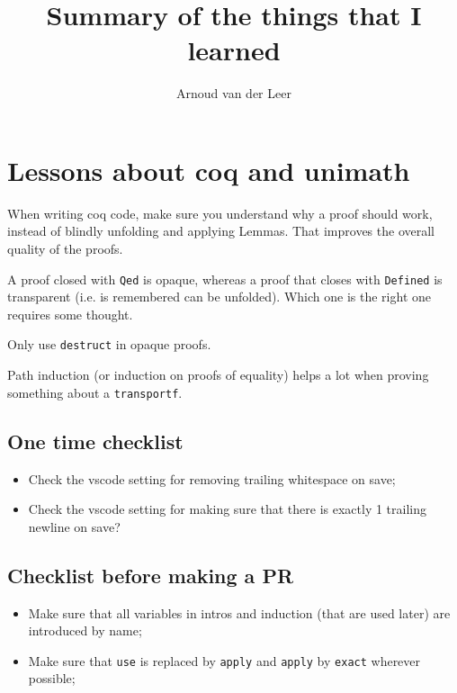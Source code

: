 \documentclass{amsbook}
\title{Summary of the things that I learned}
\author{Arnoud van der Leer}
\theoremstyle{definition}
\begin{document}
  \maketitle

  \chapter{Lessons about coq and unimath}
  When writing coq code, make sure you understand why a proof should work, instead of blindly unfolding and applying Lemmas. That improves the overall quality of the proofs.

  A proof closed with \texttt{Qed} is opaque, whereas a proof that closes with \texttt{Defined} is transparent (i.e. is remembered can be unfolded). Which one is the right one requires some thought.

  Only use \texttt{destruct} in opaque proofs.

  Path induction (or induction on proofs of equality) helps a lot when proving something about a \texttt{transportf}.

  \section{One time checklist}
  \begin{itemize}
    \item Check the vscode setting for removing trailing whitespace on save;
    \item Check the vscode setting for making sure that there is exactly 1 trailing newline on save?
  \end{itemize}

  \section{Checklist before making a PR}
  \begin{itemize}
    \item Make sure that all variables in intros and induction (that are used later) are introduced by name;
    \item Make sure that \texttt{use} is replaced by \texttt{apply} and \texttt{apply} by \texttt{exact} wherever possible;
  \end{itemize}
\end{document}
